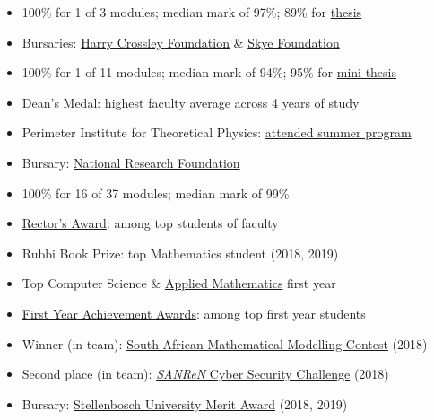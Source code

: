 \documentclass[10pt,a4paper,ragged2e,withhyper]{altacv}
\begin{document}
\begin{paracol}{2}
\begin{itemize}
    \item 100\% for 1 of 3 modules; median mark of 97\%; 89\% for
		\href{https://doi.org/10019.1/126944}{thesis}
    \item Bursaries: \href{https://thecrossleyfoundation.co.za/}{Harry Crossley Foundation}
		\& \href{http://skyefoundation.co.za/awards/awards-by-year/}{Skye Foundation}
\end{itemize}

\begin{itemize}
    \item 100\% for 1 of 11 modules; median mark of 94\%; 95\% for
		\href{https://doi.org/10.5281/zenodo.8414170}{mini thesis}
    \item Dean's Medal: highest faculty average across 4 years of study
    \item Perimeter Institute for Theoretical Physics:
		\href{https://dariotrinchero.github.io/files/pi_cert.pdf}{attended summer program}
    \item Bursary: \href{https://www.nrf.ac.za/}{National Research Foundation}
\end{itemize}

\begin{itemize}
    \item 100\% for 16 of 37 modules; median mark of 99\%
    \item \href{https://www.sun.ac.za/english/Lists/news/DispForm.aspx?ID=7717}{Rector's Award}:
		among top students of faculty
    \item Rubbi Book Prize: top Mathematics student (2018, 2019)
    \item Top Computer Science \& \href{https://appliedmaths.sun.ac.za/topachievers.html}{Applied Mathematics}
		first year
    \item \href{https://www.sun.ac.za/english/learning-teaching/ctl/t-l-awards-and-grants/first-years-prestige-dinner}%
		{First Year Achievement Awards}: among top first year students
    \item Winner (in team): \href{https://appliedmaths.sun.ac.za/sammc.html}%
		{South African Mathematical Modelling Contest} (2018)
    \item Second place (in team): \href{https://www.csc.ac.za/?page_id=665}%
		{\emph{SANReN} Cyber Security Challenge} (2018)
    \item Bursary: \href{https://finaid.sun.ac.za/merit-bursary}%
		{Stellenbosch University Merit Award} (2018, 2019)
\end{itemize}


\end{paracol}
\end{document}

